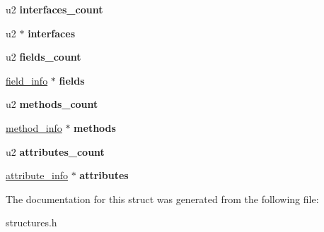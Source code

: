 \begin{DoxyCompactItemize}
\item 
u2 {\bfseries interfaces\+\_\+count}\hypertarget{structClassFile_a337fcb7da33d1b64631441115c7de305}{}\label{structClassFile_a337fcb7da33d1b64631441115c7de305}

\item 
u2 $\ast$ {\bfseries interfaces}\hypertarget{structClassFile_af599de97e062c98966470f1590496425}{}\label{structClassFile_af599de97e062c98966470f1590496425}

\item 
u2 {\bfseries fields\+\_\+count}\hypertarget{structClassFile_acea207ee523fbc16611d3cf436c390e0}{}\label{structClassFile_acea207ee523fbc16611d3cf436c390e0}

\item 
\hyperlink{structfield__info}{field\+\_\+info} $\ast$ {\bfseries fields}\hypertarget{structClassFile_aa324f88c75aa96c632f8c57d010aab0c}{}\label{structClassFile_aa324f88c75aa96c632f8c57d010aab0c}

\item 
u2 {\bfseries methods\+\_\+count}\hypertarget{structClassFile_aacfb45d4af64216324b1ae5269c870d5}{}\label{structClassFile_aacfb45d4af64216324b1ae5269c870d5}

\item 
\hyperlink{structmethod__info}{method\+\_\+info} $\ast$ {\bfseries methods}\hypertarget{structClassFile_ad061f06cd709d10dbfbf82f443e43632}{}\label{structClassFile_ad061f06cd709d10dbfbf82f443e43632}

\item 
u2 {\bfseries attributes\+\_\+count}\hypertarget{structClassFile_a633c696fbe08e7e7906b2ab1e52f3d1b}{}\label{structClassFile_a633c696fbe08e7e7906b2ab1e52f3d1b}

\item 
\hyperlink{structattribute__info}{attribute\+\_\+info} $\ast$ {\bfseries attributes}\hypertarget{structClassFile_a8bf809db8e1008f401dc3cda5e9cdb14}{}\label{structClassFile_a8bf809db8e1008f401dc3cda5e9cdb14}

\end{DoxyCompactItemize}


The documentation for this struct was generated from the following file\+:\begin{DoxyCompactItemize}
\item 
structures.\+h\end{DoxyCompactItemize}
